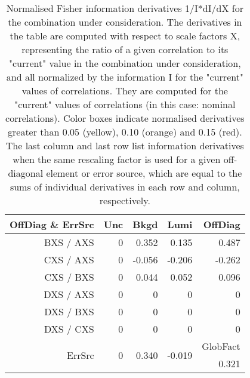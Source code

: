 \begin{table}[H]
\scriptsize
\begin{center}
\renewcommand{\arraystretch}{1.1}
\begin{tabular}{|r|rrr|r|}
\hline
 OffDiag \& ErrSrc & {\tiny Unc} & {\tiny Bkgd} & {\tiny Lumi} & OffDiag\\
\hline
BXS / AXS &  0 &  \colorbox{Tomato1}{    0.352} &  \colorbox{Orange1}{    0.135} &  \colorbox{Tomato1}{    0.487} \\
CXS / AXS &  0 &     -0.056 &     -0.206 &     -0.262 \\
CXS / BXS &  0 &      0.044 &  \colorbox{Yellow1}{    0.052} &  \colorbox{Yellow1}{    0.096} \\
DXS / AXS &  0 &  0 &  0 &  0 \\
DXS / BXS &  0 &  0 &  0 &  0 \\
DXS / CXS &  0 &  0 &  0 &  0 \\
\hline
\multirow{2}{*}{ErrSrc} & \multirow{2}{*}{ 0} & \multirow{2}{*}{ \colorbox{Tomato1}{    0.340}} & \multirow{2}{*}{    -0.019} & GlobFact\\
 & & & &  \colorbox{Tomato1}{    0.321} \\
\hline
\end{tabular}
\renewcommand{\arraystretch}{1}
\caption{Normalised Fisher information derivatives 1/I*dI/dX for the combination under consideration. The derivatives in the table are computed with respect to scale factors X, representing the ratio of a given correlation to its "current" value in the combination under consideration, and all normalized by the information I for the "current" values of correlations. They are computed for the "current" values of correlations (in this case: nominal correlations). Color boxes indicate normalised derivatives greater than 0.05 (yellow), 0.10 (orange) and 0.15 (red). The last column and last row list information derivatives when the same rescaling factor is used for a given off-diagonal element or error source, which are equal to the sums of individual derivatives in each row and column, respectively.}
\end{center}
\end{table}
